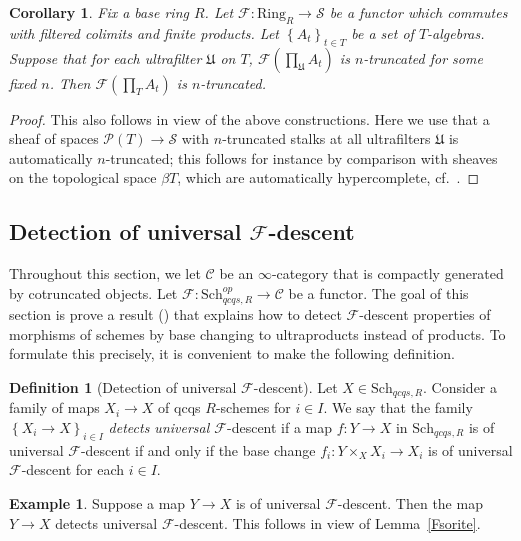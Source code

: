 \documentclass[reqno]{amsart}
\newcommand{\sF}{\mathcal{F}}
\newtheorem{corollary}[theorem]{Corollary}
\theoremstyle{definition}
\newtheorem{definition}[theorem]{Definition}
\newtheorem{example}[theorem]{Example}
\begin{document}
\begin{corollary} 
\label{truncatedultra}
Fix a base ring $R$. 
Let $\sF\colon \mathrm{Ring}_R \to \mathcal{S}$ be a functor which commutes with
filtered colimits and finite products. 
Let $\left\{A_t\right\}_{t \in T}$ be a set of $T$-algebras. 
Suppose that for each ultrafilter $\mathfrak{U}$ on $T$, 
$\sF( \prod_{\mathfrak{U}} A_t)$ is $n$-truncated for some fixed $n$. 
Then $\sF( \prod_T A_t)$ is $n$-truncated. 
\end{corollary} 
\begin{proof} 
This also follows in view of the above constructions. 
Here we use that a sheaf of spaces $\mathcal{P}(T) \to \mathcal{S}$ with $n$-truncated
stalks at all ultrafilters $\mathfrak{U}$ is automatically $n$-truncated; 
this follows for instance by comparison with sheaves on the topological space
$\beta T$, which are automatically hypercomplete,
cf.~\cite[Cor.~7.2.1.12 and Th.~7.2.3.6]{HTT}.
\end{proof} 



\subsection{Detection of universal $\mathcal{F}$-descent}
\label{DetectUnivDescent}
Throughout this section, we let $\mathcal{C}$ be an $\infty$-category
that is compactly generated by cotruncated objects. 
Let $\mathcal{F}\colon  \mathrm{Sch}_{qcqs,R}^{op} \to \mathcal{C}$ be a
functor. The goal of this section is prove a result () that explains how to detect $\mathcal{F}$-descent properties of morphisms of schemes by base changing to ultraproducts instead of products. To formulate this precisely, it is convenient to make the following definition. 

\begin{definition}[Detection of universal $\mathcal{F}$-descent]
Let $X \in \mathrm{Sch}_{qcqs,R}$. 
Consider a family of maps $X_i \to X $ of qcqs $R$-schemes for $ i \in I$. We say that  
the family $\left\{X_i \to X \right\}_{i \in I}$
\emph{detects universal
$\mathcal{F}$}-descent if a map $f\colon  Y \to X$ in $\mathrm{Sch}_{qcqs,R}$ is of universal $\mathcal{F}$-descent
if and only if the base change $f_i\colon  Y \times_X X_i \to X_i$ is of universal
$\mathcal{F}$-descent for each $i \in I$. 
\end{definition} 


\begin{example} 
\label{F1ex}
Suppose a map $Y \to X$ is of universal $\mathcal{F}$-descent. 
Then the map $Y \to X$ detects universal $\mathcal{F}$-descent. This follows in view of Lemma~\ref{Fsorite}. 
\end{example} 
\end{document}
